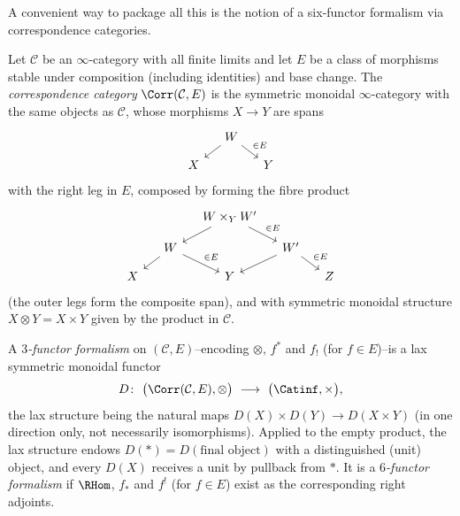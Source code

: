 A convenient way to package all this is the notion of a six-functor formalism
via correspondence categories.

\begin{definition}
\label{def:21:correspondence}
Let $\mathcal C$ be an $\infty$-category with all finite limits and let
$E$ be a class of morphisms stable under composition (including identities) and
base change. The \emph{correspondence category} $\Corr(\mathcal C,E)$ is the
symmetric monoidal $\infty$-category with the same objects as $\mathcal C$,
whose morphisms $X\to Y$ are spans
\begin{equation*}
\begin{tikzcd}[column sep=small, row sep=small]
& W \arrow[dl] \arrow[dr, "\in E"] & \\
X & & Y
\end{tikzcd}
\end{equation*}
with the right leg in $E$, composed by forming the fibre product
\begin{equation*}
\begin{tikzcd}[column sep=small, row sep=small]
& & W\times_Y W' \arrow[dl] \arrow[dr, "\in E"] & & \\
& W \arrow[dl] \arrow[dr, "\in E"] & & W' \arrow[dl] \arrow[dr, "\in E"] & \\
X & & Y & & Z
\end{tikzcd}
\end{equation*}
(the outer legs form the composite span), and with symmetric monoidal structure
$X\otimes Y=X\times Y$ given by the product in $\mathcal C$.
\end{definition}

\begin{definition}
\label{def:21:functor-formalism}
A \emph{$3$-functor formalism} on $(\mathcal C,E)$--encoding $\otimes$, $f^{*}$
and $f_{!}$ (for $f\in E$)--is a lax symmetric monoidal functor
\begin{equation*}
D\colon\ \bigl(\Corr(\mathcal C,E),\otimes\bigr)\ \longrightarrow\
\bigl(\Catinf,\times\bigr),
\end{equation*}
the lax structure being the natural maps
$D(X)\times D(Y)\to D(X\times Y)$ (in one direction only, not necessarily
isomorphisms). Applied to the empty product, the lax structure endows
$D(\ast)=D(\text{final object})$ with a distinguished (unit) object, and every
$D(X)$ receives a unit by pullback from $\ast$. It is a \emph{$6$-functor
formalism} if $\RHom$, $f_{*}$ and $f^{!}$ (for $f\in E$) exist as the
corresponding right adjoints.
\end{definition}

